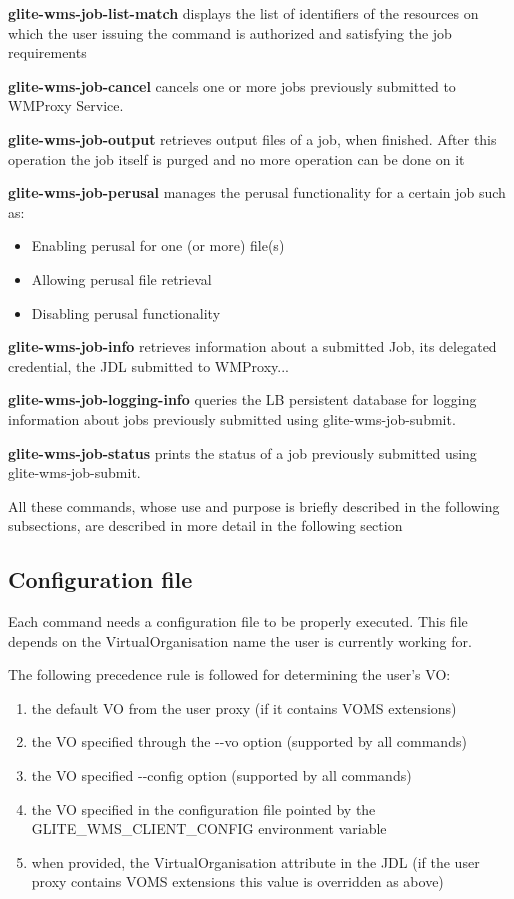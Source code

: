 \smallskip

\textbf{glite-wms-job-list-match}
displays the list of identifiers of the resources on which the user issuing the command is authorized and
satisfying the job requirements

\smallskip

\textbf{glite-wms-job-cancel}
cancels one or more jobs previously submitted to WMProxy Service.

\smallskip

\textbf{glite-wms-job-output}
retrieves output files of a job, when finished.
After this operation the job itself is purged and no more operation can be done on it


\textbf{glite-wms-job-perusal}
manages the perusal functionality for a certain job such as:
\begin{itemize}
\item Enabling perusal for one (or more) file(s)
\item Allowing perusal file retrieval
\item Disabling perusal functionality
\end{itemize}
\textbf{glite-wms-job-info}
retrieves information about a submitted Job, its delegated credential, the JDL submitted to WMProxy...


\textbf{glite-wms-job-logging-info}
queries the LB persistent database for logging information about jobs previously submitted using glite-wms-job-submit.


\textbf{glite-wms-job-status}
prints the status of a job previously submitted using glite-wms-job-submit.

\bigskip

All these commands, whose use and purpose is briefly described in the following
subsections,
are described in more detail in the following section


\subsection{Configuration file}
Each command needs a configuration file to be properly executed. This file depends on the VirtualOrganisation
name the user is currently working for.

The following precedence rule is followed for determining the user's VO:
\begin{enumerate}
\item the default VO from the user proxy (if it contains VOMS extensions)

\item the VO specified through the -{}-vo  option (supported by all commands)

\item the VO specified  -{}-config  option (supported by all commands)

\item the VO specified in the configuration file pointed by the GLITE\_WMS\_CLIENT\_CONFIG environment variable

\item when provided, the VirtualOrganisation attribute in the JDL (if the user proxy contains VOMS extensions this value is overridden as above)
\end{enumerate}

